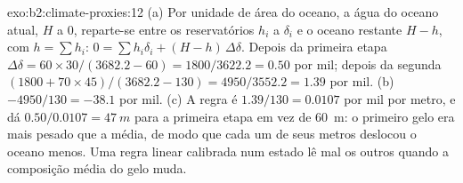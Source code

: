 \begin{solution}{exo:b2:climate-proxies:12}
(a) Por unidade de área do oceano, a água do oceano atual, $H$ a 0, reparte-se entre os reservatórios
$h_i$ a $\delta_i$ e o oceano restante $H - h$, com $h = \sum h_i$: $0 = \sum h_i\delta_i +
(H - h)\,\Delta\delta$. Depois da primeira etapa $\Delta\delta = 60 \times 30/(3682.2 - 60) =
1800/3622.2 = 0.50$ por mil; depois da segunda $(1800 + 70 \times 45)/(3682.2 - 130) =
4950/3552.2 = 1.39$ por mil. (b) $-4950/130 = -38.1$ por mil. (c) A regra é $1.39/130 = 0.0107$
por mil por metro, e dá $0.50/0.0107 = \qty{47}{m}$ para a primeira etapa em vez de
\qty{60}{m}: o primeiro gelo era mais pesado que a média, de modo que cada um de seus metros deslocou o oceano
menos. Uma regra linear calibrada num estado lê mal os outros quando a composição média do
gelo muda.
\end{solution}

